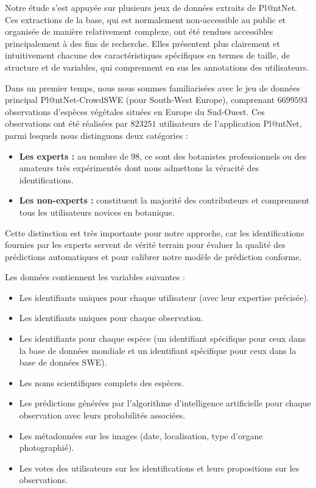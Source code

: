 \documentclass[a4paper,12pt]{article}
\begin{document}
Notre étude s'est appuyée sur plusieurs jeux de données extraits de Pl@ntNet. Ces extractions de la base, qui est normalement non-accessible au public et organisée de manière relativement complexe, ont été rendues accessibles principalement à des fins de recherche. Elles présentent plus clairement et intuitivement chacune des caractéristiques spécifiques en termes de taille, de structure et de variables, qui comprennent en sus les annotations des utilisateurs.

\vspace{0.2cm}

Dans un premier temps, nous nous sommes familiarisées avec le jeu de données principal Pl@ntNet-CrowdSWE (pour South-West Europe), comprenant $\num{6 699 593}$ observations d'espèces végétales situées en Europe du Sud-Ouest. Ces observations ont été réalisées par $\num{823 251}$ utilisateurs de l'application Pl@ntNet, parmi lesquels nous distinguons deux catégories : 
\begin{itemize}
    \item \textbf{Les experts :} au nombre de $98$, ce sont des botanistes professionnels ou des amateurs très expérimentés dont nous admettons la véracité des identifications.
    \item \textbf{Les non-experts :} constituent la majorité des contributeurs et comprennent tous les utilisateurs novices en botanique.
\end{itemize}

\vspace{0.2cm}

Cette distinction est très importante pour notre approche, car les identifications fournies par les experts servent de vérité terrain pour évaluer la qualité des prédictions automatiques et pour calibrer notre modèle de prédiction conforme.

\vspace{0.2cm}

Les données contiennent les variables suivantes :
\begin{itemize}
    \item Les identifiants uniques pour chaque utilisateur (avec leur expertise précisée).
    \item Les identifiants uniques pour chaque observation.
    \item Les identifiants pour chaque espèce (un identifiant spécifique pour ceux dans la base de données mondiale et un identifiant spécifique pour ceux dans la base de données SWE).
    \item Les noms scientifiques complets des espèces.
    \item Les prédictions générées par l'algorithme d'intelligence artificielle pour chaque observation avec leurs probabilités associées.
    \item Les métadonnées sur les images (date, localisation, type d'organe photographié).
    \item Les votes des utilisateurs sur les identifications et leurs propositions sur les observations.
\end{itemize}
\end{document}
